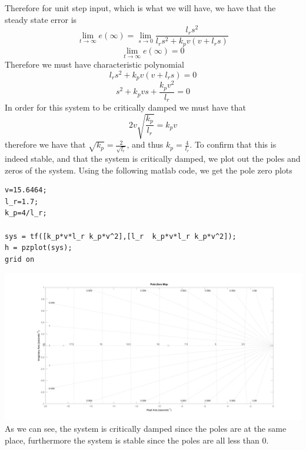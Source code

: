 \documentclass[12pt]{article}
\begin{document}
Therefore for unit step input, which is what we will have, we have that the steady state error is 
$$\lim_{t\to\infty}e(\infty)=\lim_{s\to0}\frac{l_r s^2}{l_r s^2+k_pv(v+l_r s)}$$
$$\lim_{t\to\infty}e(\infty)=0$$
Therefore we must have characteristic polynomial
$$l_r s^2+k_pv(v+l_r s)=0$$
$$s^2+k_pvs+\frac{k_pv^2}{l_r}=0$$
In order for this system to be critically damped we must have that
$$2v\sqrt{\frac{k_p}{l_r}}=k_pv$$
therefore we have that $\sqrt{k_p}=\frac{2}{\sqrt{l_r}}$, and thus $k_p=\frac{4}{l_r}$. To confirm that this is indeed stable, and that the system is critically damped, we plot out
the poles and zeros of the system. Using the following matlab code, we get the pole zero plots
\begin{verbatim}
v=15.6464;
l_r=1.7;
k_p=4/l_r;

sys = tf([k_p*v*l_r k_p*v^2],[l_r  k_p*v*l_r k_p*v^2]);
h = pzplot(sys);
grid on
\end{verbatim}
\includegraphics[scale=0.3]{Problem2Fig1.png}
As we can see, the system is critically damped since the poles are at the same place, furthermore the system is stable since the poles are all
less than 0.
\end{document}
